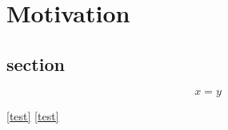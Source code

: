 \chapter{Motivation}
\section{section}
\lipsum[]\cite{lamport94}

\begin{equation}
    x=y
    \label{test}
\end{equation}

\lipsum[10]
\ref{test}
\lipsum[10]
\autoref{test}